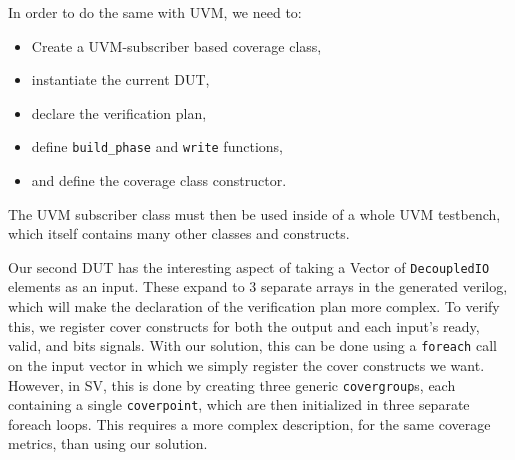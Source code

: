 \documentclass[conference]{IEEEtran}
\newcommand{\martin}[1]{{\color{blue} Martin: #1}}
\begin{document}
In order to do the same with UVM, we need to:  
\begin{itemize}
    \item Create a UVM-subscriber based coverage class,
    \item instantiate the current DUT, %
    \item declare the verification plan,
    \item define \texttt{build\_phase} and \texttt{write} functions,
    \item and define the coverage class constructor.
\end{itemize}  
The UVM subscriber class must then be used inside of a whole UVM testbench, which itself contains many other classes and constructs.

Our second DUT has the interesting aspect of taking a Vector of \texttt{DecoupledIO} elements as an input. 
These expand to 3 separate arrays in the generated verilog, which will make the declaration of the verification plan more complex. %
To verify this, we register cover constructs for both the output and each input's ready, valid, and bits signals.
With our solution, this can be done using a \texttt{foreach} call on the input vector in which we simply register the cover constructs we want.
However, in SV, this is done by creating three generic \texttt{covergroup}s, each containing a single \texttt{coverpoint}, which are then initialized in three separate foreach loops.
This requires a more complex description, for the same coverage metrics, than using our solution. %
 
\end{document}
